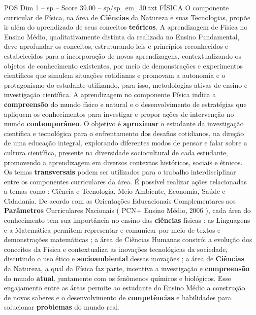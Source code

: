 \begin{textsample}{POS Dim 1 – sp – Score 39.00 – sp/sp\_em\_30.txt}  \label{ex:f1_pos_116}
FÍSICA O componente curricular de Física, na área de \textbf{Ciências} da Natureza e suas Tecnologias, propõe ir além do aprendizado de seus conceitos \textbf{teóricos}.
A aprendizagem de Física no Ensino Médio, qualitativamente distinta da realizada no Ensino Fundamental, deve aprofundar os conceitos, estruturando leis e princípios reconhecidos e estabelecidos para a incorporação de novas aprendizagens, contextualizando os objetos de conhecimento existentes, por meio de demonstrações e experimentos científicos que simulem situações cotidianas e promovam a autonomia e o protagonismo do estudante utilizando, para isso, metodologias ativas de ensino e investigação científica.
A aprendizagem no componente Física indica a \textbf{compreensão} do mundo físico e natural e o desenvolvimento de estratégias que apliquem os conhecimentos para investigar e propor ações de intervenção no mundo \textbf{contemporâneo}.
O objetivo é \textbf{aproximar} o estudante da investigação científica e tecnológica para o enfrentamento dos desafios cotidianos, na direção de uma educação integral, explorando diferentes modos de pensar e falar sobre a cultura científica, presente na diversidade sociocultural de cada estudante, promovendo a aprendizagem em diversos contextos históricos, sociais e étnicos.
Os temas \textbf{transversais} podem ser utilizados para o trabalho interdisciplinar entre os componentes curriculares da área.
É possível realizar ações relacionadas a temas como : Ciência e Tecnologia, Meio Ambiente, Economia, Saúde e Cidadania.
De acordo com as Orientações Educacionais Complementares aos \textbf{Parâmetros} Curriculares Nacionais ( PCN+ Ensino Médio, 2006 ), cada área do conhecimento tem sua importância no ensino das \textbf{ciências} físicas : as Linguagens e a Matemática permitem representar e comunicar por meio de textos e demonstrações matemáticas ; a área de Ciências Humanas constrói a evolução dos conceitos da Física e contextualiza as inovações tecnológicas da sociedade, discutindo o uso ético e \textbf{socioambiental} dessas inovações ; a área de \textbf{Ciências} da Natureza, a qual da Física faz parte, incentiva a investigação e \textbf{compreensão} do mundo \textbf{atual}, juntamente com os fenômenos químicos e biológicos.
Esse engajamento entre as áreas permite ao estudante do Ensino Médio a construção de novos saberes e o desenvolvimento de \textbf{competências} e habilidades para solucionar \textbf{problemas} do mundo real.

\end{textsample}
